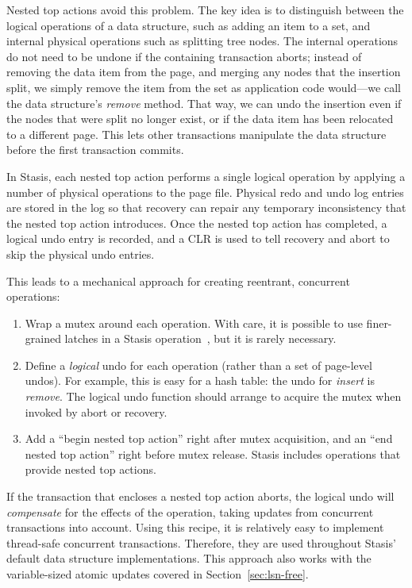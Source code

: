 \documentclass[letterpaper,twocolumn,10pt]{article}
\newcommand{\yad}{Stasis\xspace}
\newcommand{\yads}{Stasis'\xspace}
\begin{document}
Nested top actions avoid this problem.  The key idea is to distinguish
between the logical operations of a data structure, such as
adding an item to a set, and internal physical operations such as
splitting tree nodes. 
The internal operations do not need to be undone if the
containing transaction aborts; instead of removing the data item from
the page, and merging any nodes that the insertion split, we simply
remove the item from the set as application code would---we call the
data structure's {\em remove} method.  That way, we can undo the
insertion even if the nodes that were split no longer exist, or if the
data item has been relocated to a different page.  This
lets other transactions manipulate the data structure before the first
transaction commits.

In \yad, each nested top action performs a single logical operation by applying
a number of physical operations to the page file.  Physical redo and undo log entries are stored in the log so that recovery can repair any
temporary inconsistency that the nested top action introduces.  Once
the nested top action has completed, a logical undo entry is recorded,
and a CLR is used to tell recovery and abort to skip the physical
undo entries.

This leads to a mechanical approach for creating reentrant, concurrent
operations:

\begin{enumerate}
\item Wrap a mutex around each operation.  With care, it is possible 
  to use finer-grained latches in a \yad operation~\cite{ariesIM}, but it is rarely necessary.
\item Define a {\em logical} undo for each operation (rather than a set of page-level undos).  For example, this is easy for a
  hash table: the undo for {\em insert} is {\em remove}.  The logical
  undo function should arrange to acquire the mutex when invoked by
  abort or recovery.
\item Add a ``begin nested top action'' right after mutex
  acquisition, and an ``end nested top action'' right before mutex
  release.  \yad includes operations that provide nested top
  actions.
\end{enumerate}

If the transaction that encloses a nested top action aborts, the
logical undo will {\em compensate} for the effects of the operation, 
taking updates from concurrent transactions into account.
Using this recipe, it is relatively easy to implement thread-safe
concurrent transactions.  Therefore, they are used throughout \yads
default data structure implementations.  This approach also works 
with the variable-sized atomic updates covered in Section~\ref{sec:lsn-free}.
\end{document}
